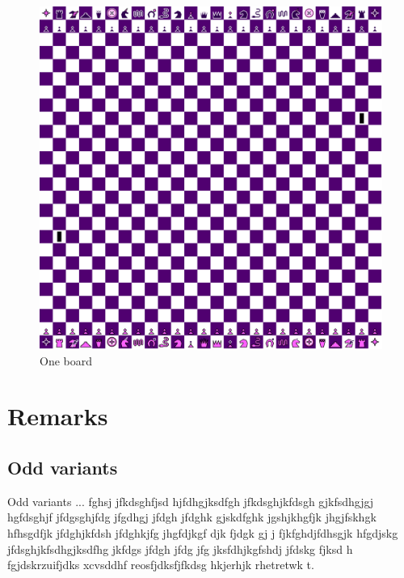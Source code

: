 \documentclass[a5paper,12pt,draft]{book} %
\begin{document}
\noindent
\begin{figure}[h]
\includegraphics[width=1.0\textwidth, keepaspectratio=true]{../gfx/boards/22_one.png}
\caption{One board}
\label{fig:one}
\end{figure}

\clearpage

\chapter*{Remarks}

\section*{Odd variants}

\indent
Odd variants ... fghsj jfkdsghfjsd hjfdhgjksdfgh jfkdsghjkfdsgh gjkfsdhgjgj
hgfdsghjf jfdgsghjfdg jfgdhgj jfdgh jfdghk gjskdfghk jgshjkhgfjk jhgjfskhgk
hfhsgdfjk jfdghjkfdsh jfdghkjfg jhgfdjkgf djk fjdgk gj j fjkfghdjfdhsgjk
hfgdjskg jfdsghjkfsdhgjksdfhg jkfdgs jfdgh jfdg jfg jksfdhjkgfshdj jfdskg
fjksd h fgjdskrzuifjdks xcvsddhf reosfjdksfjfkdsg hkjerhjk rhetretwk t.
\end{document}
